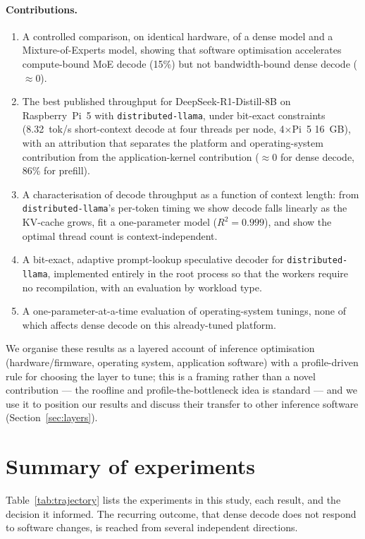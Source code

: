 \documentclass[10pt,a4paper]{article}
\begin{document}
\paragraph{Contributions.}
\begin{enumerate}
  \item A controlled comparison, on identical hardware, of a dense model and a Mixture-of-Experts model, showing that software optimisation accelerates compute-bound MoE decode (15\%) but not bandwidth-bound dense decode ($\approx$0).
  \item The best published throughput for DeepSeek-R1-Distill-8B on Raspberry~Pi~5 with \texttt{distributed-llama}, under bit-exact constraints (8.32~tok/s short-context decode at four threads per node, 4$\times$Pi~5 16~GB), with an attribution that separates the platform and operating-system contribution from the application-kernel contribution ($\approx$0 for dense decode, 86\% for prefill).
  \item A characterisation of decode throughput as a function of context length: from \texttt{distributed-llama}'s per-token timing we show decode falls linearly as the KV-cache grows, fit a one-parameter model ($R^2{=}0.999$), and show the optimal thread count is context-independent.
  \item A bit-exact, adaptive prompt-lookup speculative decoder for \texttt{distributed-llama}, implemented entirely in the root process so that the workers require no recompilation, with an evaluation by workload type.
  \item A one-parameter-at-a-time evaluation of operating-system tunings, none of which affects dense decode on this already-tuned platform.
\end{enumerate}
We organise these results as a layered account of inference optimisation (hardware/firmware, operating system, application software) with a profile-driven rule for choosing the layer to tune; this is a framing rather than a novel contribution --- the roofline and profile-the-bottleneck idea is standard --- and we use it to position our results and discuss their transfer to other inference software (Section~\ref{sec:layers}).

\section{Summary of experiments}
\label{sec:trajectory}
Table~\ref{tab:trajectory} lists the experiments in this study, each result, and the decision it informed. The recurring outcome, that dense decode does not respond to software changes, is reached from several independent directions.
\end{document}
